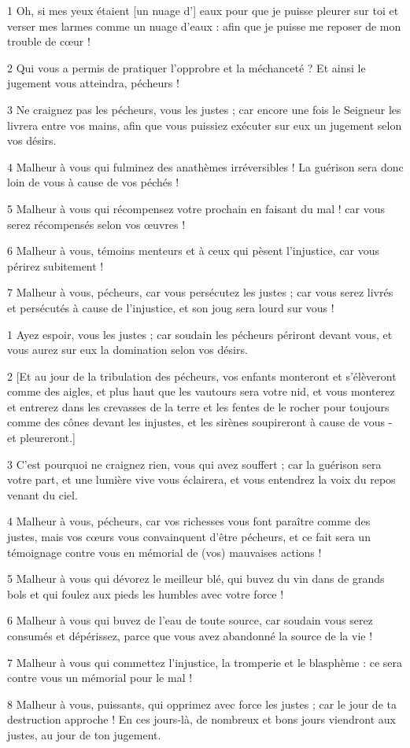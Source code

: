 \par 1 Oh, si mes yeux étaient [un nuage d'] eaux pour que je puisse pleurer sur toi et verser mes larmes comme un nuage d'eaux : afin que je puisse me reposer de mon trouble de cœur !
\par 2 Qui vous a permis de pratiquer l'opprobre et la méchanceté ? Et ainsi le jugement vous atteindra, pécheurs !
\par 3 Ne craignez pas les pécheurs, vous les justes ; car encore une fois le Seigneur les livrera entre vos mains, afin que vous puissiez exécuter sur eux un jugement selon vos désirs.
\par 4 Malheur à vous qui fulminez des anathèmes irréversibles ! La guérison sera donc loin de vous à cause de vos péchés !
\par 5 Malheur à vous qui récompensez votre prochain en faisant du mal ! car vous serez récompensés selon vos œuvres !
\par 6 Malheur à vous, témoins menteurs et à ceux qui pèsent l'injustice, car vous périrez subitement !
\par 7 Malheur à vous, pécheurs, car vous persécutez les justes ; car vous serez livrés et persécutés à cause de l'injustice, et son joug sera lourd sur vous !


\par 1 Ayez espoir, vous les justes ; car soudain les pécheurs périront devant vous, et vous aurez sur eux la domination selon vos désirs.
\par 2 [Et au jour de la tribulation des pécheurs, vos enfants monteront et s'élèveront comme des aigles, et plus haut que les vautours sera votre nid, et vous monterez et entrerez dans les crevasses de la terre et les fentes de le rocher pour toujours comme des cônes devant les injustes, et les sirènes soupireront à cause de vous - et pleureront.]
\par 3 C'est pourquoi ne craignez rien, vous qui avez souffert ; car la guérison sera votre part, et une lumière vive vous éclairera, et vous entendrez la voix du repos venant du ciel.
\par 4 Malheur à vous, pécheurs, car vos richesses vous font paraître comme des justes, mais vos cœurs vous convainquent d'être pécheurs, et ce fait sera un témoignage contre vous en mémorial de (vos) mauvaises actions !
\par 5 Malheur à vous qui dévorez le meilleur blé, qui buvez du vin dans de grands bols et qui foulez aux pieds les humbles avec votre force !
\par 6 Malheur à vous qui buvez de l'eau de toute source, car soudain vous serez consumés et dépérissez, parce que vous avez abandonné la source de la vie !
\par 7 Malheur à vous qui commettez l'injustice, la tromperie et le blasphème : ce sera contre vous un mémorial pour le mal !
\par 8 Malheur à vous, puissants, qui opprimez avec force les justes ; car le jour de ta destruction approche ! En ces jours-là, de nombreux et bons jours viendront aux justes, au jour de ton jugement.

